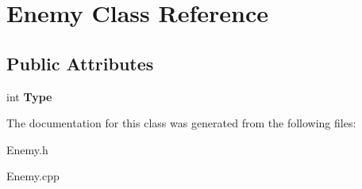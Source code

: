 \hypertarget{class_enemy}{}\section{Enemy Class Reference}
\label{class_enemy}
\subsection*{Public Attributes}
\begin{DoxyCompactItemize}
\item 
\mbox{\label{class_enemy_abcb0e70353f2647bee9fc6973685fc95}} 
int {\bfseries Type}
\end{DoxyCompactItemize}


The documentation for this class was generated from the following files\+:\begin{DoxyCompactItemize}
\item 
Enemy.\+h\item 
Enemy.\+cpp\end{DoxyCompactItemize}

